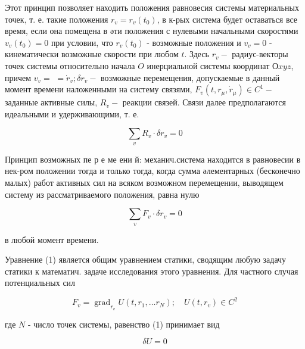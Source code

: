 \documentclass[10pt]{article}
\begin{document}
Этот принцип позволяет находить положения равновесия системы материальных точек, т. е. такие положения $r_{v}=r_{v}\left(t_{0}\right)$, в к-рых система будет оставаться все время, если она помещена в әти положения с нулевыми начальными скоростями $v_{v}\left(t_{0}\right)=0$ при условии, что $r_{v}\left(t_{0}\right)$ - возможные положения и $v_{v}=0$ - кинематически возможные скорости при любом $t$. Здесь $r_{v}-$ радиус-векторы точек системы относительно начала $O$ инерциальной системы координат $О x y z$, причем $v_{v}=$ $=\dot{r}_{v} ; \delta r_{v}-$ возможные перемещения, допускаемые в данный момент времени наложенными на систему связями, $F_{v}\left(t, r_{\mu}, \dot{r}_{\mu}\right) \in C^{1}-$ заданные активные силы, $R_{v}-$ реакции связей. Связи далее предполагаются идеальными и удерживающими, т. е.



\[

\sum_{v} R_{v} \cdot \delta r_{v}=0

\]



Принцип возможных пе р е ме ени й: механич.система находится в равновесии в нек-ром положении тогда и только тогда, когда сумма әлементарных (бесконечно малых) работ активных сил на всяком возможном перемещении, выводящем систему из рассматриваемого положения, равна нулю



\[

\sum_{v} F_{v} \cdot \delta r_{v}=0

\]



в любой момент времени.



Уравнение (1) является общим уравнением статики, сводящим любую задачу статики к математич. задаче исследования этого уравнения. Для частного случая потенциальных сил



\[

F_{v}=\operatorname{grad}_{r_{v}} U\left(t, r_{1}, \ldots r_{N}\right) ; \quad U\left(t, r_{v}\right) \in C^{2}

\]



где $N$ - число точек системы, равенство (1) принимает вид



\[

\delta U=0

\]
\end{document}
